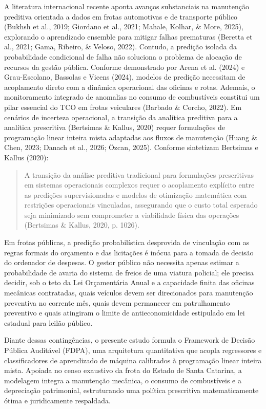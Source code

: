 \documentclass[10pt,a4paper,journal]{article}
\begin{document}
A literatura internacional recente aponta avanços substanciais na manutenção preditiva orientada a dados em frotas automotivas e de transporte público (Bukhsh et al., 2019; Giordano et al., 2021; Mahale, Kolhar, \& More, 2025), explorando o aprendizado ensemble para mitigar falhas prematuras (Beretta et al., 2021; Gama, Ribeiro, \& Veloso, 2022). Contudo, a predição isolada da probabilidade condicional de falha não soluciona o problema de alocação de recursos da gestão pública. Conforme demonstrado por Arena et al. (2024) e Grau-Escolano, Bassolas e Vicens (2024), modelos de predição necessitam de acoplamento direto com a dinâmica operacional das oficinas e rotas. Ademais, o monitoramento integrado de anomalias no consumo de combustíveis constitui um pilar essencial do TCO em frotas veiculares (Barbado \& Corcho, 2022). Em cenários de incerteza operacional, a transição da analítica preditiva para a analítica prescritiva (Bertsimas \& Kallus, 2020) requer formulações de programação linear inteira mista adaptadas aos fluxos de manutenção (Huang \& Chen, 2023; Danach et al., 2026; Özcan, 2025). Conforme sintetizam Bertsimas e Kallus (2020):

\begin{quote}
\small A transição da análise preditiva tradicional para formulações prescritivas em sistemas operacionais complexos requer o acoplamento explícito entre as predições supervisionadas e modelos de otimização matemática com restrições operacionais vinculadas, assegurando que o custo total esperado seja minimizado sem comprometer a viabilidade física das operações (Bertsimas \& Kallus, 2020, p. 1026).
\end{quote}
Em frotas públicas, a predição probabilística desprovida de vinculação com as regras formais do orçamento e das licitações é inócua para a tomada de decisão do ordenador de despesas. O gestor público não necessita apenas estimar a probabilidade de avaria do sistema de freios de uma viatura policial; ele precisa decidir, sob o teto da Lei Orçamentária Anual e a capacidade finita das oficinas mecânicas contratadas, quais veículos devem ser direcionados para manutenção preventiva no corrente mês, quais devem permanecer em patrulhamento preventivo e quais atingiram o limite de antieconomicidade estipulado em lei estadual para leilão público.

Diante dessas contingências, o presente estudo formula o Framework de Decisão Pública Auditável (FDPA), uma arquitetura quantitativa que acopla regressores e classificadores de aprendizado de máquina calibrados à programação linear inteira mista. Apoiada no censo exaustivo da frota do Estado de Santa Catarina, a modelagem integra a manutenção mecânica, o consumo de combustíveis e a depreciação patrimonial, estruturando uma política prescritiva matematicamente ótima e juridicamente respaldada.
\end{document}
